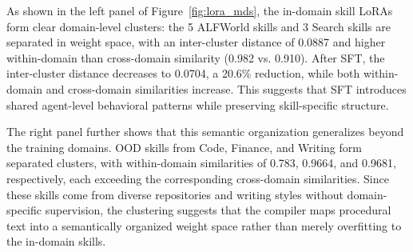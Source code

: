 As shown in the left panel of Figure~\ref{fig:lora_mds}, the in-domain skill LoRAs form clear domain-level clusters: the 5 ALFWorld skills and 3 Search skills are separated in weight space, with an inter-cluster distance of 0.0887 and higher within-domain than cross-domain similarity (0.982 vs. 0.910). After SFT, the inter-cluster distance decreases to 0.0704, a 20.6\% reduction, while both within-domain and cross-domain similarities increase. This suggests that SFT introduces shared agent-level behavioral patterns while preserving skill-specific structure.

The right panel further shows that this semantic organization generalizes beyond the training domains. OOD skills from Code, Finance, and Writing form separated clusters, with within-domain similarities of 0.783, 0.9664, and 0.9681, respectively, each exceeding the corresponding cross-domain similarities. Since these skills come from diverse repositories and writing styles without domain-specific supervision, the clustering suggests that the compiler maps procedural text into a semantically organized weight space rather than merely overfitting to the in-domain skills.

